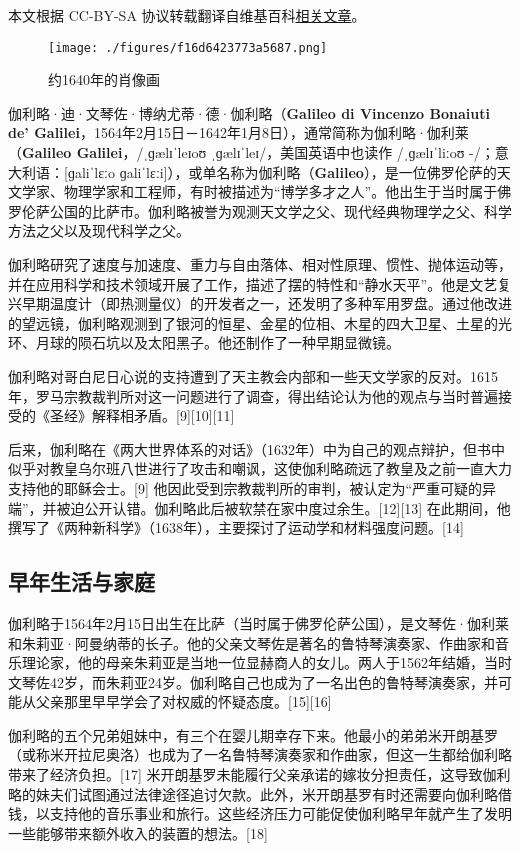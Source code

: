 
本文根据 CC-BY-SA 协议转载翻译自维基百科\href{https://en.wikipedia.org/wiki/Galileo_Galilei}{相关文章}。

\begin{figure}[ht]
\centering
\texttt{[image: ./figures/f16d6423773a5687.png]}
\caption{约1640年的肖像画} \label{fig_JLL_1}
\end{figure}
伽利略·迪·文琴佐·博纳尤蒂·德·伽利略（\textbf{Galileo di Vincenzo Bonaiuti de' Galilei}，1564年2月15日－1642年1月8日），通常简称为伽利略·伽利莱（\textbf{Galileo Galilei}，/ˌɡælɪˈleɪoʊ ˌɡælɪˈleɪ/，美国英语中也读作 /ˌɡælɪˈliːoʊ -/；意大利语：[ɡaliˈlɛːo ɡaliˈlɛːi]），或单名称为伽利略（\textbf{Galileo}），是一位佛罗伦萨的天文学家、物理学家和工程师，有时被描述为“博学多才之人”。他出生于当时属于佛罗伦萨公国的比萨市。伽利略被誉为观测天文学之父、现代经典物理学之父、科学方法之父以及现代科学之父。

伽利略研究了速度与加速度、重力与自由落体、相对性原理、惯性、抛体运动等，并在应用科学和技术领域开展了工作，描述了摆的特性和“静水天平”。他是文艺复兴早期温度计（即热测量仪）的开发者之一，还发明了多种军用罗盘。通过他改进的望远镜，伽利略观测到了银河的恒星、金星的位相、木星的四大卫星、土星的光环、月球的陨石坑以及太阳黑子。他还制作了一种早期显微镜。

伽利略对哥白尼日心说的支持遭到了天主教会内部和一些天文学家的反对。1615年，罗马宗教裁判所对这一问题进行了调查，得出结论认为他的观点与当时普遍接受的《圣经》解释相矛盾。[9][10][11]

后来，伽利略在《两大世界体系的对话》（1632年）中为自己的观点辩护，但书中似乎对教皇乌尔班八世进行了攻击和嘲讽，这使伽利略疏远了教皇及之前一直大力支持他的耶稣会士。[9] 他因此受到宗教裁判所的审判，被认定为“严重可疑的异端”，并被迫公开认错。伽利略此后被软禁在家中度过余生。[12][13] 在此期间，他撰写了《两种新科学》（1638年），主要探讨了运动学和材料强度问题。[14]
\subsection{早年生活与家庭}  
伽利略于1564年2月15日出生在比萨（当时属于佛罗伦萨公国），是文琴佐·伽利莱和朱莉亚·阿曼纳蒂的长子。他的父亲文琴佐是著名的鲁特琴演奏家、作曲家和音乐理论家，他的母亲朱莉亚是当地一位显赫商人的女儿。两人于1562年结婚，当时文琴佐42岁，而朱莉亚24岁。伽利略自己也成为了一名出色的鲁特琴演奏家，并可能从父亲那里早早学会了对权威的怀疑态度。[15][16]  

伽利略的五个兄弟姐妹中，有三个在婴儿期幸存下来。他最小的弟弟米开朗基罗（或称米开拉尼奥洛）也成为了一名鲁特琴演奏家和作曲家，但这一生都给伽利略带来了经济负担。[17] 米开朗基罗未能履行父亲承诺的嫁妆分担责任，这导致伽利略的妹夫们试图通过法律途径追讨欠款。此外，米开朗基罗有时还需要向伽利略借钱，以支持他的音乐事业和旅行。这些经济压力可能促使伽利略早年就产生了发明一些能够带来额外收入的装置的想法。[18]  

